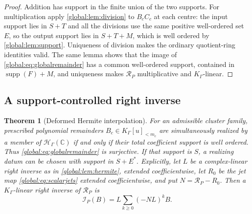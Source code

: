 \documentclass[11pt,letterpaper]{article}
\newtheorem{theorem}{Theorem}[section]
\theoremstyle{definition}
\theoremstyle{remark}
\newcommand{\C}{\mathbb C}
\newcommand{\HH}{\mathscr H_\Gamma}
\newcommand{\KK}{K_\Gamma}
\newcommand{\supp}{\operatorname{supp}}
\newcommand{\jet}{\mathcal R}
\numberwithin{equation}{section}
\begin{document}
\begin{proof}
Addition has support in the finite union of the two supports. For multiplication apply \cref{global:lem:division} to $B_cC_c$ at each centre: the input support lies in $S+T$ and all the divisions use the same positive well-ordered set $E$, so the output support lies in $S+T+M$, which is well ordered by \cref{global:lem:support}. Uniqueness of division makes the ordinary quotient-ring identities valid. The same lemma shows that the image of \eqref{global:eq:globalremainder} has a common well-ordered support, contained in $\supp(F)+M$, and uniqueness makes $\jet_P$ multiplicative and $\KK$-linear.
\end{proof}

\subsection{A support-controlled right inverse}

\begin{theorem}[Deformed Hermite interpolation]\label{global:thm:interpolation}
For an admissible cluster family, prescribed polynomial remainders $B_c\in\KK[u]_{<m_c}$ are simultaneously realized by a member of $\HH(\C)$ if and only if their total coefficient support is well ordered. Thus \eqref{global:eq:globalremainder} is surjective. If that support is $S$, a realizing datum can be chosen with support in $S+E^*$. Explicitly, let $L$ be a complex-linear right inverse as in \cref{global:lem:hermite}, extended coefficientwise, let $R_0$ be the jet map \eqref{global:eq:scalarjets} extended coefficientwise, and put $N=\jet_P-R_0$. Then a $\KK$-linear right inverse of $\jet_P$ is
\begin{equation}\label{global:eq:interpolator}
  \mathcal I_P(B)=L\sum_{k\ge0}(-NL)^kB .
\end{equation}
\end{theorem}
\end{document}
